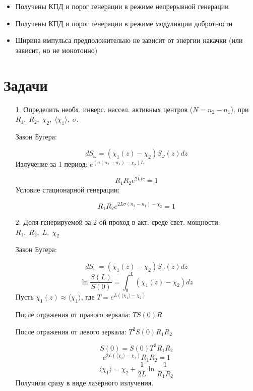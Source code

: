 \documentclass[a4paper]{article}
\begin{document}
\begin{itemize}
	\item Получены КПД и порог генерации в режиме непрерывной генерации
	\item Получены КПД и порог генерации в режиме модулияции добротности
	\item Ширина импульса предположительно не зависит от энергии накачки (или зависит, но не монотонно)
\end{itemize}

\newpage

\section{Задачи}

\begin{itemize}

	\item[1.] Определить необх. инверс. нассел. активных центров ($N=n_2-n_1$), при $R_1,\;R_2,\;\chi_2,\;\langle \chi_1 \rangle,\; \sigma$. \par
		Закон Бугера: \par 
		$$dS_{\omega} = (\chi_1(z) - \chi_2) S_{\omega} (z) dz$$
		Излучение за 1 период: $e^{(\sigma(n_2-n_1)-\chi_2)L}$ \par 
		$$R_1R_2 e^{2L(c} = 1$$
		Условие стационарной генерации: \par 
		$$R_1R_2 e^{2L\sigma(n_2-n_1)-\chi_2} = 1$$

	\item[2.] Доля генерируемой за 2-ой проход в акт. среде свет. мощности. $R_1,\;R_2,\;L,\;\chi_2$ \par 
		Закон Бугера: \par 
		$$dS_{\omega} = (\chi_1(z) - \chi_2) S_{\omega} (z) dz$$
		$$\ln{\frac{S(L)}{S(0)}} = \int_0^L (\chi_1(z) - \chi_2) dz$$
		Пусть $\chi_1(z) \approx \langle \chi_1 \rangle$, где $T = e^{L(\langle \chi_1 \rangle - \chi_2)}$ \par 
		После отражения от правого зеркала: $TS(0)R$ \par 
		После отражения от левого зеркала: $T^2 S(0) R_1R_2$\par 
		$$S(0) = S(0) T^2 R_1R_2$$
		$$e^{2L(\langle \chi_1 \rangle - \chi_2)} R_1R_2 = 1$$
		$$\langle \chi_1 \rangle = \chi_2 + \frac{1}{2L} \ln{\frac{1}{R_1R_2}}$$ Получили сразу в виде лазерного излучения.


\end{itemize}
\end{document}
